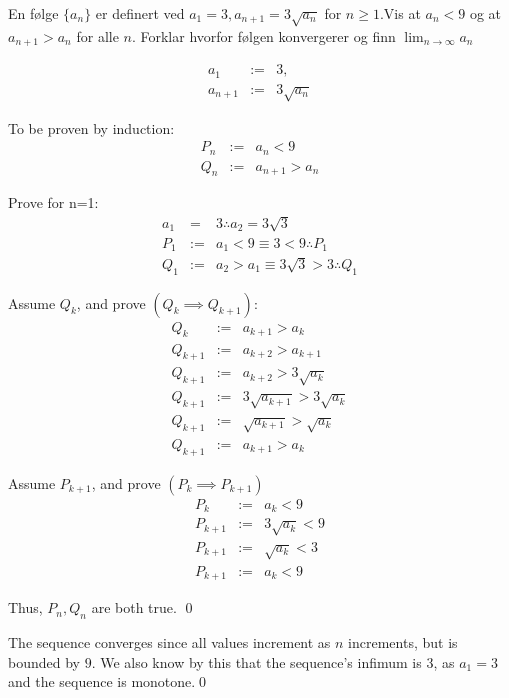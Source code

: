 \documentclass{myassignment}
\begin{document}
	\pagebreak
	\begin{problem}
		En følge $\{ a_n \}$ er definert ved $a_1 = 3, a_{n+1} = 3\sqrt{a_n}$ for $n \geq 1$.Vis at $a_n < 9$ og at $a_{n+1} > a_n$ for alle $n$. Forklar hvorfor følgen konvergerer og finn $\lim_{n \rightarrow \infty}{a_n}$
	\end{problem}
	\begin{answer}
		\begin{eqnarray}
		a_1 &:=& 3,\\
		a_{n+1} &:=& 3\sqrt{a_n}
		\end{eqnarray}

		To be proven by induction:
		\begin{eqnarray}
		P_n &:=& a_n < 9\\
		Q_n &:=& a_{n+1} > a_n
		\end{eqnarray}

		Prove for n=1:
		\begin{eqnarray}
			a_1 &=& 3 \therefore a_2 = 3\sqrt{3}\\
			P_1 &:=& a_1  < 9 \equiv 3 < 9 \therefore P_1\\
			Q_1 &:=& a_2 > a_1 \equiv 3\sqrt{3} > 3 \therefore Q_1
		\end{eqnarray}
		
		Assume $Q_{k}$, and prove $(Q_{k} \implies Q_{k+1})$:
		\begin{eqnarray}
			Q_{k} &:=& a_{k+1} > a_k \\
			Q_{k+1} &:=& a_{k+2} > a_{k+1}\\
			Q_{k+1} &:=& a_{k+2} > 3\sqrt{a_k}\\
			Q_{k+1} &:=& 3\sqrt{a_{k+1}} > 3\sqrt{a_k}\\
			Q_{k+1} &:=& \sqrt{a_{k+1}} > \sqrt{a_k}\\
			Q_{k+1} &:=& a_{k+1} > a_k
		\end{eqnarray}

		\blackqed

		Assume $P_{k+1}$, and prove $(P_{k} \implies P_{k+1})$
		\begin{eqnarray}
			P_{k} &:=& a_{k} < 9\\
			P_{k+1} &:=& 3\sqrt{a_k} < 9\\
			P_{k+1} &:=& \sqrt{a_k} < 3\\
			P_{k+1} &:=& a_k < 9
		\end{eqnarray}
		\blackqed

		Thus, $P_{n}, Q_{n}$ are both true.
		\qed

		\pagebreak
		The sequence converges since all values increment as $n$ increments, but is bounded by $9$. We also know by this that the sequence's infimum is 3, as $a_1=3$ and the sequence is monotone.\qed


\end{answer}
\end{document}

